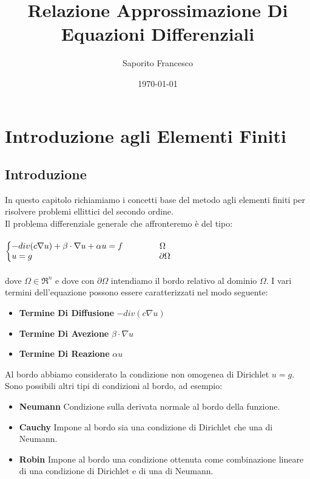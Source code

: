 \documentclass[12pt,a4paper]{report}
\author{Saporito Francesco}
\title{Relazione Approssimazione Di Equazioni Differenziali}
\date{\today}
\makeatletter
\theoremstyle{theorem}
\theoremstyle{definition}
\newenvironment{system}
{\left\lbrace\begin{array}{@{}l@{}}}
{\end{array}\right.}
\makeatother
\begin{document}
\maketitle

\tableofcontents

 

\chapter{Introduzione agli Elementi Finiti}

\section{Introduzione}
In questo capitolo richiamiamo i concetti base del metodo agli elementi finiti per risolvere problemi ellittici del secondo ordine.\\
Il problema differenziale generale che affronteremo è del tipo:\\\\  \label{DirichletProblem}
\begin{math}
\begin{system}
-div(c\nabla{u})+\beta \cdot \nabla{u} + \alpha u = f \qquad \qquad \ \Omega \\
u = g \qquad \qquad \qquad \qquad \qquad \qquad \qquad \quad \partial \Omega \\
\end{system}
\end{math}
\hfill \\\\
dove $\Omega \in \Re^{n}$ e dove con $\partial \Omega$ intendiamo il bordo relativo al dominio $\Omega$. I vari termini dell'equazione possono essere caratterizzati nel modo seguente:
\begin{itemize}
	\item \textbf{Termine Di Diffusione} $-div(c\nabla{u})$
	\item \textbf{Termine Di Avezione} $\beta \cdot \nabla{u}$
	\item \textbf{Termine Di Reazione} $\alpha u$	
\end{itemize}
Al bordo abbiamo considerato la condizione non omogenea di Dirichlet $u = g$. Sono possibili altri tipi di condizioni al bordo, ad esempio:
\begin{itemize}
	\item \textbf{Neumann} Condizione sulla derivata normale al bordo della funzione.
	\item \textbf{Cauchy} Impone al bordo sia una condizione di Dirichlet che una di Neumann.
	\item \textbf{Robin} Impone al bordo una condizione ottenuta come combinazione lineare di una condizione di Dirichlet e di una di Neumann.
\end{itemize}
\end{document}
